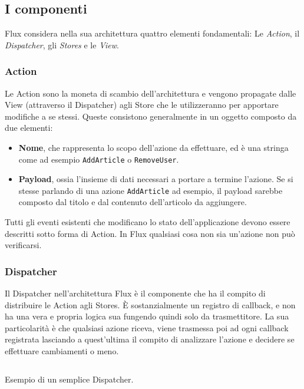 \subsection{I componenti}
\label{FluxComponents}
Flux considera nella sua architettura quattro elementi fondamentali: Le \textit{Action}, il \textit{Dispatcher}, gli \textit{Stores} e le \textit{View}.

\subsubsection*{Action}
Le Action sono la moneta di scambio dell'architettura e vengono propagate dalle View (attraverso il Dispatcher) agli Store che le utilizzeranno per apportare modifiche a se stessi. Queste consistono generalmente in un oggetto composto da due elementi:

    \begin{itemize}
        \item \textbf{Nome}, che rappresenta lo scopo dell'azione da effettuare, ed è una stringa come ad esempio \texttt{AddArticle} o \texttt{RemoveUser}. 
        \item \textbf{Payload}, ossia l'insieme di dati necessari a portare a termine l'azione. Se si stesse parlando di una azione \texttt{AddArticle} ad esempio, il payload sarebbe composto dal titolo e dal contenuto dell'articolo da aggiungere.
    \end{itemize}

Tutti gli eventi esistenti che modificano lo stato dell'applicazione devono essere descritti sotto forma di Action. In Flux qualsiasi cosa non sia un'azione non può verificarsi.

\subsubsection*{Dispatcher}
Il Dispatcher nell'architettura Flux è il componente che ha il compito di distribuire le Action agli Stores. È sostanzialmente un registro di callback, e non ha una vera e propria logica sua fungendo quindi solo da trasmettitore. La sua particolarità è che qualsiasi azione riceva, viene trasmessa poi ad ogni callback registrata lasciando a quest'ultima il compito di analizzare l'azione e decidere se effettuare cambiamenti o meno.

\begin{listing}[ht]
\inputminted{javascript}{sources/fluxDispatcherExample.js}
\caption{Esempio di un semplice Dispatcher.} 
\label{applicationMVCPresenterEvents} 
\end{listing} 

